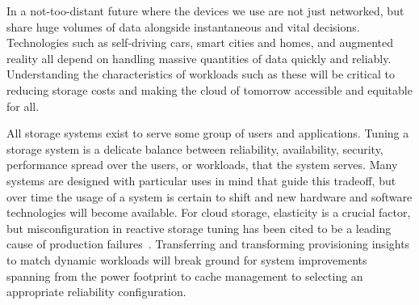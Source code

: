 In a not-too-distant future where the devices we use are not just networked, but
share huge volumes of data alongside instantaneous and vital decisions.
Technologies such as self-driving cars, smart cities and homes, and augmented
reality all depend on handling massive quantities of data quickly and reliably.
Understanding the characteristics of workloads such as these will be critical to
reducing storage costs and making the cloud of tomorrow accessible and equitable
for all.

%

%


All storage systems exist to serve some group of users and applications.
Tuning a storage system is a delicate
balance between reliability, availability, security, performance spread over the
users, or workloads, that the system serves. %
  Many systems are designed with particular uses in mind that guide this
  tradeoff, but over time the usage of a system is certain to shift and new hardware and
  software technologies will become available.
  For cloud storage, elasticity is a
crucial factor, but misconfiguration in reactive storage tuning has been cited
to be a leading cause of production failures~\cite{yin2011empirical}.  
  Transferring and transforming
  provisioning insights to match dynamic workloads will break ground for system
  improvements spanning from the power footprint to cache management to
  selecting an appropriate reliability configuration. 

